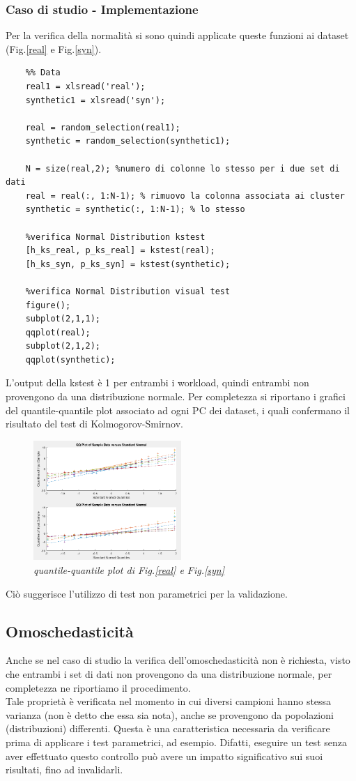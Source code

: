 \subsubsection{Caso di studio - Implementazione}
Per la verifica della normalità si sono quindi applicate queste funzioni ai dataset (Fig.\ref{real} e Fig.\ref{syn}).
\begin{verbatim}
	%% Data
	real1 = xlsread('real');
	synthetic1 = xlsread('syn');
	
	real = random_selection(real1);
	synthetic = random_selection(synthetic1);
	
	N = size(real,2); %numero di colonne lo stesso per i due set di dati
	real = real(:, 1:N-1); % rimuovo la colonna associata ai cluster
	synthetic = synthetic(:, 1:N-1); % lo stesso
	
	%verifica Normal Distribution kstest
	[h_ks_real, p_ks_real] = kstest(real);
	[h_ks_syn, p_ks_syn] = kstest(synthetic);
	
	%verifica Normal Distribution visual test
	figure();
	subplot(2,1,1);
	qqplot(real);
	subplot(2,1,2);
	qqplot(synthetic);
\end{verbatim}
L'output della kstest è 1 per entrambi i workload, quindi entrambi non provengono da una distribuzione normale. Per completezza si riportano i grafici del quantile-quantile plot associato ad ogni PC dei dataset, i quali confermano il risultato del test di Kolmogorov-Smirnov.
\begin{figure}[H]
	\centering
	\includegraphics[width=0.5\textwidth]{img/hw3/qqplot.png}
	\caption{\textit{quantile-quantile plot di Fig.\ref{real} e Fig.\ref{syn}}}
\end{figure}
Ciò suggerisce l'utilizzo di test non parametrici per la validazione.
\subsection{Omoschedasticità}
Anche se nel caso di studio la verifica dell'omoschedasticità non è richiesta, visto che entrambi i set di dati non provengono da una distribuzione normale, per completezza ne riportiamo il procedimento.
\\
Tale proprietà è verificata nel momento in cui diversi campioni hanno stessa varianza (non è detto che essa sia nota), anche se provengono da popolazioni (distribuzioni) differenti. Questa è una caratteristica necessaria da verificare prima di applicare i test parametrici, ad esempio. Difatti, eseguire un test senza aver effettuato questo controllo può avere un impatto significativo sui suoi risultati, fino ad invalidarli.
